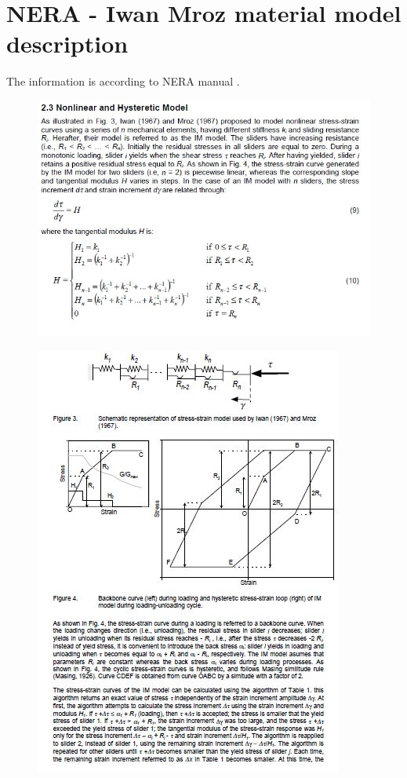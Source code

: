 \documentclass[12pt,a4paper]{report}
\begin{document}
\chapter{NERA - Iwan Mroz material model description} \label{NERAa}
The information is according to NERA manual \cite{NERA}.
\begin{figure}[h!]
	\centering
	\includegraphics[width=1\linewidth]{"NERA1"}
	\label{Nera1}
\end{figure}

\begin{figure}[h!]
	\centering
	\includegraphics[width=1\linewidth]{"NERA2"}
	\label{Nera2}
\end{figure}
\end{document}
